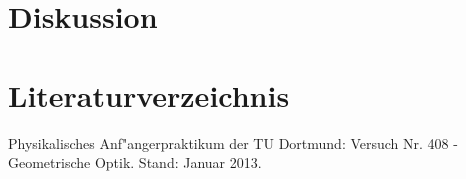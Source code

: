 \newpage
\section{Diskussion}
	\label{sec:diskussion}

\section{Literaturverzeichnis}
	\label{sec:literaturverzeichnis}

	\begin{thebibliography}{9}
		 Physikalisches Anf"angerpraktikum der TU Dortmund: Versuch Nr. 408 - Geometrische Optik. Stand: Januar 2013.
	\end{thebibliography}
